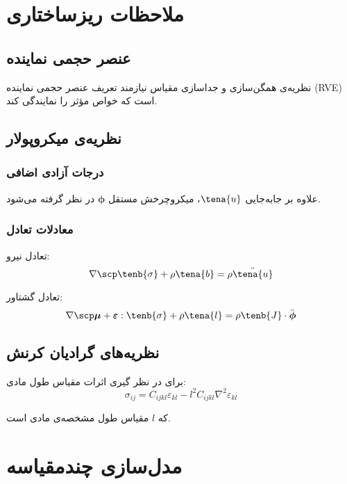 \section{ملاحظات ریزساختاری}

\subsection{عنصر حجمی نماینده}

نظریه‌ی همگن‌سازی و جداسازی مقیاس نیازمند تعریف عنصر حجمی نماینده (RVE) است که خواص مؤثر را نمایندگی کند.

\subsection{نظریه‌ی میکروپولار}

\subsubsection{درجات آزادی اضافی}
علاوه بر جابه‌جایی $\tena{u}$، میکروچرخش مستقل $\boldsymbol{\phi}$ در نظر گرفته می‌شود.

\subsubsection{معادلات تعادل}
تعادل نیرو:
\begin{equation}
	\nabla \scp \tenb{\sigma} + \rho \tena{b} = \rho \ddot{\tena{u}}
\end{equation}

تعادل گشتاور:
\begin{equation}
	\nabla \scp \boldsymbol{\mu} + \boldsymbol{\varepsilon} : \tenb{\sigma} + \rho \tena{l} = \rho \tenb{J} \cdot \ddot{\boldsymbol{\phi}}
\end{equation}

\subsection{نظریه‌های گرادیان کرنش}

برای در نظر گیری اثرات مقیاس طول مادی:
\begin{equation}
	\sigma_{ij} = C_{ijkl} \varepsilon_{kl} - l^2 C_{ijkl} \nabla^2 \varepsilon_{kl}
\end{equation}

که $l$ مقیاس طول مشخصه‌ی مادی است.

\section{مدل‌سازی چندمقیاسه}


